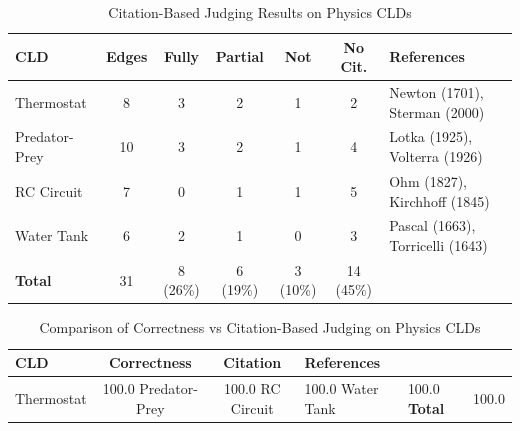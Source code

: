 \begin{table}[htbp]
\centering
\caption{Citation-Based Judging Results on Physics CLDs}
\label{tab:physics-citation-results}
\begin{tabular}{lcccccl}
\toprule
\textbf{CLD} & \textbf{Edges} & \textbf{Fully} & \textbf{Partial} & \textbf{Not} & \textbf{No Cit.} & \textbf{References} \\
\midrule
Thermostat & 8 & 3 & 2 & 1 & 2 & Newton (1701), Sterman (2000) \\
Predator-Prey & 10 & 3 & 2 & 1 & 4 & Lotka (1925), Volterra (1926) \\
RC Circuit & 7 & 0 & 1 & 1 & 5 & Ohm (1827), Kirchhoff (1845) \\
Water Tank & 6 & 2 & 1 & 0 & 3 & Pascal (1663), Torricelli (1643) \\
\midrule
\textbf{Total} & 31 & 8 (26\%) & 6 (19\%) & 3 (10\%) & 14 (45\%) & \\
\bottomrule
\end{tabular}
\end{table}


\begin{table}[htbp]
\centering
\caption{Comparison of Correctness vs Citation-Based Judging on Physics CLDs}
\label{tab:physics-comparison}
\begin{tabular}{lccl}
\toprule
\textbf{CLD} & \textbf{Correctness} & \textbf{Citation} & \textbf{References} \\
\midrule
Thermostat & 100.0%
Predator-Prey & 100.0%
RC Circuit & 100.0%
Water Tank & 100.0%
\midrule
\textbf{Total} & 100.0%
\bottomrule
\end{tabular}
\end{table}
